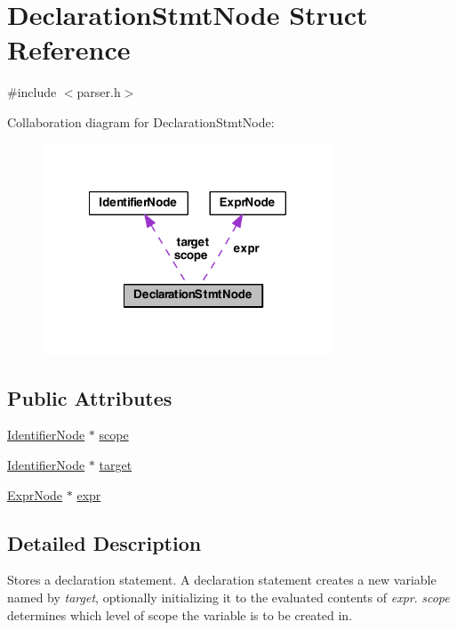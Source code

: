 \hypertarget{struct_declaration_stmt_node}{\section{Declaration\-Stmt\-Node Struct Reference}
\label{struct_declaration_stmt_node}
}


{\ttfamily \#include $<$parser.\-h$>$}



Collaboration diagram for Declaration\-Stmt\-Node\-:
\nopagebreak
\begin{figure}[H]
\begin{center}
\leavevmode
\includegraphics[width=245pt]{struct_declaration_stmt_node__coll__graph}
\end{center}
\end{figure}
\subsection*{Public Attributes}
\begin{DoxyCompactItemize}
\item 
\hyperlink{struct_identifier_node}{Identifier\-Node} $\ast$ \hyperlink{struct_declaration_stmt_node_ab52e3859c15ef8b651f330bcd963c56c}{scope}
\item 
\hyperlink{struct_identifier_node}{Identifier\-Node} $\ast$ \hyperlink{struct_declaration_stmt_node_a6fed156d07803ffd41487e873bcef98f}{target}
\item 
\hyperlink{struct_expr_node}{Expr\-Node} $\ast$ \hyperlink{struct_declaration_stmt_node_aba3f89fdd66c4b0264490aa639a6bd6f}{expr}
\end{DoxyCompactItemize}


\subsection{Detailed Description}
Stores a declaration statement. A declaration statement creates a new variable named by {\itshape target\/}, optionally initializing it to the evaluated contents of {\itshape expr\/}. {\itshape scope\/} determines which level of scope the variable is to be created in.

